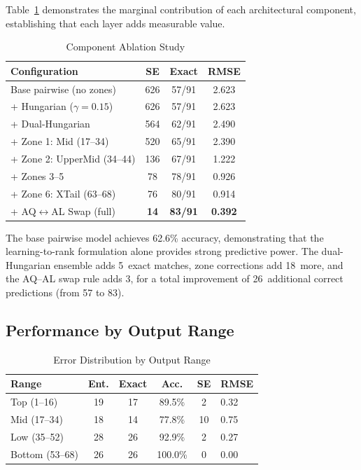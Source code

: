 \documentclass[conference]{IEEEtran}
\begin{document}
Table~\ref{tab:ablation} demonstrates the marginal contribution of each architectural component, establishing that each layer adds measurable value.

\begin{table}[htbp]
\centering
\caption{Component Ablation Study}
\label{tab:ablation}
\begin{tabular}{@{}lccc@{}}
\toprule
\textbf{Configuration} & \textbf{SE} & \textbf{Exact} & \textbf{RMSE} \\
\midrule
Base pairwise (no zones) & 626 & 57/91 & 2.623 \\
+ Hungarian ($\gamma\!=\!0.15$) & 626 & 57/91 & 2.623 \\
+ Dual-Hungarian & 564 & 62/91 & 2.490 \\
+ Zone 1: Mid (17--34) & 520 & 65/91 & 2.390 \\
+ Zone 2: UpperMid (34--44) & 136 & 67/91 & 1.222 \\
+ Zones 3--5 & 78 & 78/91 & 0.926 \\
+ Zone 6: XTail (63--68) & 76 & 80/91 & 0.914 \\
+ AQ$\leftrightarrow$AL Swap (full) & \textbf{14} & \textbf{83/91} & \textbf{0.392} \\
\bottomrule
\end{tabular}
\end{table}

The base pairwise model achieves 62.6\% accuracy, demonstrating that the learning-to-rank formulation alone provides strong predictive power. The dual-Hungarian ensemble adds 5~exact matches, zone corrections add 18~more, and the AQ--AL swap rule adds 3, for a total improvement of 26~additional correct predictions (from 57 to 83).

\subsection{Performance by Output Range}

\begin{table}[htbp]
\centering
\caption{Error Distribution by Output Range}
\label{tab:range}
\begin{tabular}{@{}lccccl@{}}
\toprule
\textbf{Range} & \textbf{Ent.} & \textbf{Exact} & \textbf{Acc.} & \textbf{SE} & \textbf{RMSE} \\
\midrule
Top (1--16) & 19 & 17 & 89.5\% & 2 & 0.32 \\
Mid (17--34) & 18 & 14 & 77.8\% & 10 & 0.75 \\
Low (35--52) & 28 & 26 & 92.9\% & 2 & 0.27 \\
Bottom (53--68) & 26 & 26 & 100.0\% & 0 & 0.00 \\
\bottomrule
\end{tabular}
\end{table}
\end{document}
